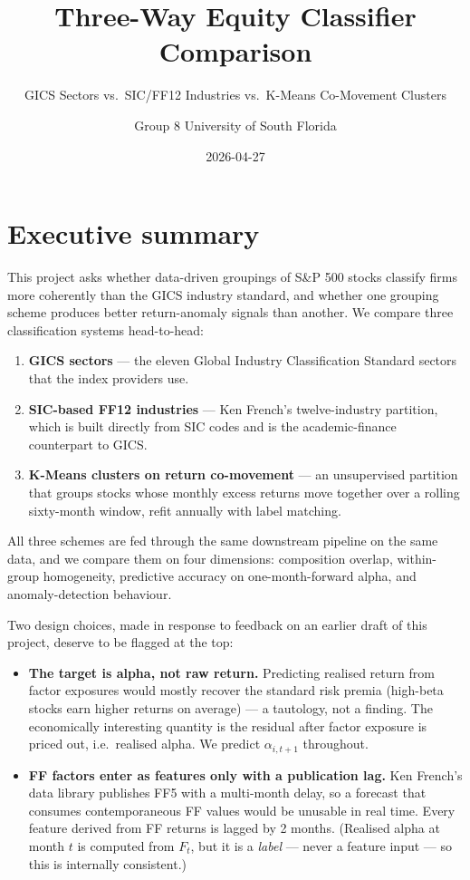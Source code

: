 \documentclass[
  letterpaper,
  DIV=11,
  numbers=noendperiod]{scrartcl}
\title{Three-Way Equity Classifier Comparison}
\subtitle{GICS Sectors vs.~SIC/FF12 Industries vs.~K-Means Co-Movement
Clusters}
\author{Group 8 \textbar{} University of South Florida}
\date{2026-04-27}
\providecommand{\tightlist}{%
  \setlength{\itemsep}{0pt}\setlength{\parskip}{0pt}}
\renewcommand*\contentsname{Table of contents}
\newcommand\contentsname{Table of contents}
\begin{document}
\maketitle

\renewcommand*\contentsname{Table of contents}
{
\setcounter{tocdepth}{3}
\tableofcontents
}

\section{Executive summary}\label{executive-summary}

This project asks whether data-driven groupings of S\&P 500 stocks
classify firms more coherently than the GICS industry standard, and
whether one grouping scheme produces better return-anomaly signals than
another. We compare three classification systems head-to-head:

\begin{enumerate}
\def\labelenumi{\arabic{enumi}.}
\tightlist
\item
  \textbf{GICS sectors} --- the eleven Global Industry Classification
  Standard sectors that the index providers use.
\item
  \textbf{SIC-based FF12 industries} --- Ken French's twelve-industry
  partition, which is built directly from SIC codes and is the
  academic-finance counterpart to GICS.
\item
  \textbf{K-Means clusters on return co-movement} --- an unsupervised
  partition that groups stocks whose monthly excess returns move
  together over a rolling sixty-month window, refit annually with label
  matching.
\end{enumerate}

All three schemes are fed through the same downstream pipeline on the
same data, and we compare them on four dimensions: composition overlap,
within-group homogeneity, predictive accuracy on one-month-forward
alpha, and anomaly-detection behaviour.

Two design choices, made in response to feedback on an earlier draft of
this project, deserve to be flagged at the top:

\begin{itemize}
\tightlist
\item
  \textbf{The target is alpha, not raw return.} Predicting realised
  return from factor exposures would mostly recover the standard risk
  premia (high-beta stocks earn higher returns on average) --- a
  tautology, not a finding. The economically interesting quantity is the
  residual after factor exposure is priced out, i.e.~realised alpha. We
  predict \(\alpha_{i,t+1}\) throughout.
\item
  \textbf{FF factors enter as features only with a publication lag.} Ken
  French's data library publishes FF5 with a multi-month delay, so a
  forecast that consumes contemporaneous FF values would be unusable in
  real time. Every feature derived from FF returns is lagged by 2
  months. (Realised alpha at month \(t\) is computed from \(F_t\), but
  it is a \emph{label} --- never a feature input --- so this is
  internally consistent.)
\end{itemize}
\end{document}
